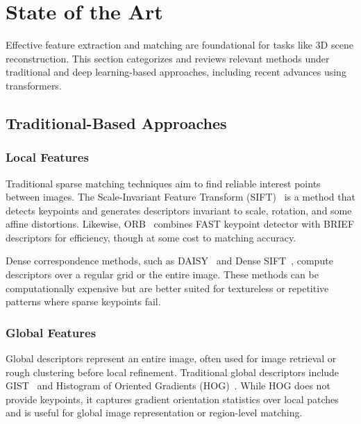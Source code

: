 \documentclass[report.tex]{subfiles}
\begin{document}


\chapter{State of the Art}

Effective feature extraction and matching are foundational for tasks like 3D scene reconstruction. This section categorizes and reviews relevant methods under traditional and deep learning-based approaches, including recent advances using transformers.

 \section{Traditional-Based Approaches}
\subsection{Local Features}

Traditional sparse matching techniques aim to find reliable interest points between images. The Scale-Invariant Feature Transform (SIFT)~\cite{lowe2004sift} is a method that detects keypoints and generates descriptors invariant to scale, rotation, and some affine distortions. Likewise, ORB~\cite{rublee2011orb} combines FAST keypoint detector with BRIEF descriptors for efficiency, though at some cost to matching accuracy.

Dense correspondence methods, such as DAISY~\cite{4815264} and Dense SIFT~\cite{vedaldi2008vlfeat}, compute descriptors over a regular grid or the entire image. These methods can be computationally expensive but are better suited for textureless or repetitive patterns where sparse keypoints fail.

\subsection{Global Features}
Global descriptors represent an entire image, often used for image retrieval or rough clustering before local refinement. Traditional global descriptors include GIST~\cite{oliva2001gist} and Histogram of Oriented Gradients (HOG)~\cite{dalal2005hog}. While HOG does not provide keypoints, it captures gradient orientation statistics over local patches and is useful for global image representation or region-level matching.
\end{document}
